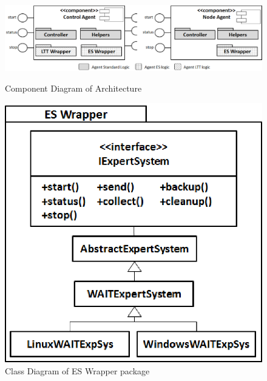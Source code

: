 \documentclass[runningheads,a4paper]{llncs}
\begin{document}
\begin{figure}
\centering
\begin{minipage}[b]{.67\textwidth}

\centering
\includegraphics[totalheight=.25\textheight,width=1.0\textwidth]{Components}
\caption{Component Diagram of Architecture}
\label{fig_components}

\end{minipage}\qquad
\begin{minipage}[b]{.27\textwidth}

\centering
\includegraphics[totalheight=.25\textheight,width=1.0\textwidth]{Wrapper}
\caption{Class Diagram of ES Wrapper package}
\label{fig_wrapper}

\end{minipage}
\end{figure}
\end{document}
